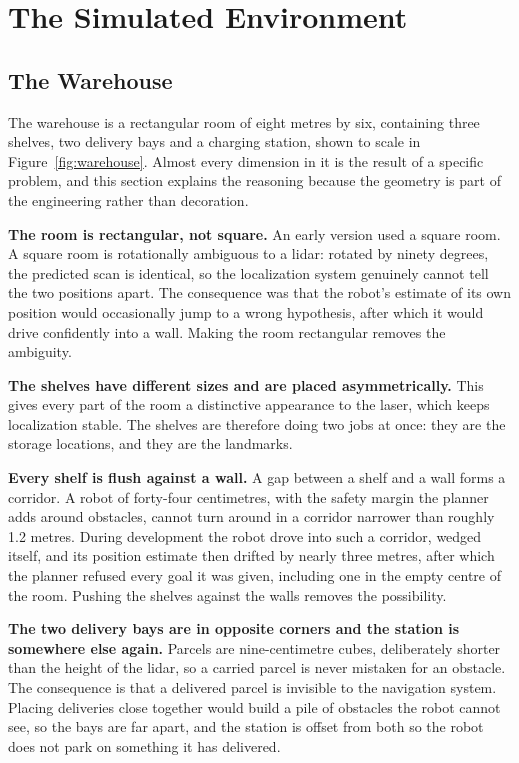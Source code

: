 \documentclass[12pt,a4paper]{report}
\begin{document}
\chapter{The Simulated Environment}
\label{ch:environment}

\section{The Warehouse}
The warehouse is a rectangular room of eight metres by six, containing three shelves, two delivery
bays and a charging station, shown to scale in Figure~\ref{fig:warehouse}. Almost every dimension in
it is the result of a specific problem, and this section explains the reasoning because the geometry
is part of the engineering rather than decoration.

\textbf{The room is rectangular, not square.} An early version used a square room. A square room is
rotationally ambiguous to a lidar: rotated by ninety degrees, the predicted scan is identical, so
the localization system genuinely cannot tell the two positions apart. The consequence was that the
robot's estimate of its own position would occasionally jump to a wrong hypothesis, after which it
would drive confidently into a wall. Making the room rectangular removes the ambiguity.

\textbf{The shelves have different sizes and are placed asymmetrically.} This gives every part of
the room a distinctive appearance to the laser, which keeps localization stable. The shelves are
therefore doing two jobs at once: they are the storage locations, and they are the landmarks.

\textbf{Every shelf is flush against a wall.} A gap between a shelf and a wall forms a corridor. A
robot of forty-four centimetres, with the safety margin the planner adds around obstacles, cannot
turn around in a corridor narrower than roughly 1.2 metres. During development the robot drove into
such a corridor, wedged itself, and its position estimate then drifted by nearly three metres,
after which the planner refused every goal it was given, including one in the empty centre of the
room. Pushing the shelves against the walls removes the possibility.

\textbf{The two delivery bays are in opposite corners and the station is somewhere else again.}
Parcels are nine-centimetre cubes, deliberately shorter than the height of the lidar, so a carried
parcel is never mistaken for an obstacle. The consequence is that a delivered parcel is invisible to
the navigation system. Placing deliveries close together would build a pile of obstacles the robot
cannot see, so the bays are far apart, and the station is offset from both so the robot does not
park on something it has delivered.
\end{document}
